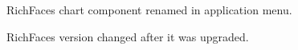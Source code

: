 \documentclass[11pt,oneside,final]{fithesis2}
\begin{document}
  
  \begin{figure}[!htb]
      \begin{center}
      \leavevmode
      \centerline{}
      \end{center}
      \caption{RichFaces chart component renamed in application menu.}
      \label{fig:chartComponentRenamed}
  \end{figure}
  
  \begin{figure}[!htb]
      \begin{center}
      \leavevmode
      \centerline{}
      \end{center}
      \caption{RichFaces version changed after it was upgraded.}
      \label{fig:rfVersionChanged}
  \end{figure}
\end{document}
